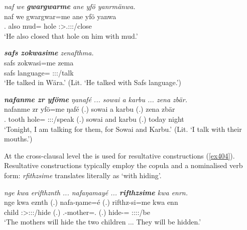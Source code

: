\begin{exe}
	\ex \emph{naf we \textbf{gwargwarme} ane yfö yanrmänwa.}\\
	\gll naf we {gwargwar=me} ane yfö yanwa\\
	\Tsg.\Erg{} also {mud=\Ins} \Dem{} hole \Stsg:\Sbj>\Tsg.\Masc:\Io:\Nonpast:\Ipfv/close\\
	\trans `He also closed that hole on him with mud.'
	\label{ex407}
\end{exe}
\begin{exe}
	\ex \emph{\textbf{safs zokwasime} zenafthma.}\\
	\gll safs zokwasi=me zema\\
	safs language=\Ins{} \Stsg:\Sbj:\Pst:\Pfv/talk\\
	\trans `He talked in Wära.' (Lit. `He talked with Safs language.')\\
	\label{ex405}
\end{exe}
\begin{exe}
	\ex \emph{\textbf{nafanme zr yföme} ŋanafé ... sowai a karbu ... zena zbär.}\\
	\gll nafanme zr yfö=me ŋafé (.) sowai a karbu (.) zena zbär\\
	\Tnsg.\Poss{} tooth hole=\Ins{} \Fsg:\Sbj:\Nonpast:\Ipfv/speak (.) sowai and karbu (.) today night\\
	\trans `Tonight, I am talking for them, for Sowai and Karbu.' (Lit. `I talk with their mouths.')
	\label{ex408}
\end{exe}
	
At the cross-clausal level the   is used for resultative constructions (\ref{ex404}). Resultative constructions typically employ the copula and a nominalised verb form: \emph{rfithzsime} translates literally as `with hiding'.

\begin{exe}
	\ex \emph{nge kwa erifthznth ... nafaŋamayé ... \textbf{rifthzsime} kwa enrn.}\\
	\gll nge kwa eznth (.) nafa-ŋame=é (.) rifthz-si=me kwa enn\\
	child \Fut{} \Stpl:\Sbj>\Stdu:\Obj:\Nonpast:\Ipfv/hide (.) \Third.\Poss-mother=\Erg.\Nsg{} (.) hide-\Nmlz=\Ins{} \Fut{} \Stdu:\Sbj:\Nonpast:\Ipfv:\Venit/be\\
	\trans `The mothers will hide the two children ... They will be hidden.'\\
	\label{ex404}
\end{exe}

